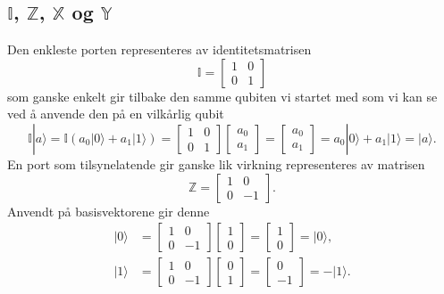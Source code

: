 \subsection{$\mathbb{I}$, $\mathbb{Z}$, $\mathbb{X}$ og $\mathbb{Y}$} 
Den enkleste porten representeres av identitetsmatrisen
\begin{displaymath}
	\mathbb{I} = \left[\begin{array}{rr}1 & 0 \\ 0 & 1 \end{array}\right]
\end{displaymath}
som ganske enkelt gir tilbake den samme qubiten vi startet med som vi kan se ved å anvende den på en vilkårlig qubit
\begin{displaymath}
	\mathbb{I}|a\rangle = \mathbb{I}(a_0|0\rangle + a_1|1\rangle)= \left[\begin{array}{rr}1 & 0 \\ 0 & 1 \end{array}\right]\left[\begin{array}{r} a_0 \\ a_1\end{array}\right] 
	= \left[\begin{array}{r} a_0 \\ a_1\end{array}\right] = a_0|0\rangle + a_1|1\rangle =  |a\rangle.
\end{displaymath}
En port som tilsynelatende gir ganske lik virkning representeres av matrisen
\begin{displaymath}
	\mathbb{Z} = \left[\begin{array}{rr}1 & 0 \\ 0 & -1 \end{array}\right].
\end{displaymath}
Anvendt på basisvektorene gir denne
\begin{align*}
	\mathbb|0\rangle &=  \left[\begin{array}{rr}1 & 0 \\ 0 & -1 \end{array}\right] \left[\begin{array}{r} 1 \\ 0 \end{array}\right]
	 =  \left[\begin{array}{r} 1 \\ 0 \end{array}\right] = |0\rangle, \\
	\mathbb|1\rangle &=  \left[\begin{array}{rr}1 & 0 \\ 0 & -1 \end{array}\right] \left[\begin{array}{r} 0 \\ 1 \end{array}\right] 
	= \left[\begin{array}{r} 0 \\ -1 \end{array}\right] = -|1\rangle.
\end{align*}
